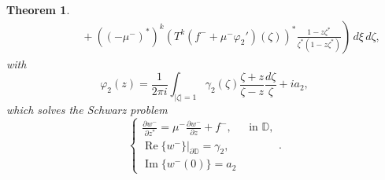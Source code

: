 \documentclass[12pt,reqno]{amsart}
\newtheorem{theorem}{Theorem}[section]
\theoremstyle{definition}
\theoremstyle{remark}
\newcommand{\p}{\partial}
\DeclareMathOperator{\im}{Im}
\DeclareMathOperator{\re}{Re}
\newcommand{\disk}{\mathbb{D}}
\begin{document}
\begin{theorem}
\begin{align*}
            &\quad\quad\quad\quad +  \left. ((-\mu^-)^*)^k (T^k(f^-+\mu^-\varphi_2')(\zeta))^*\frac{1-z \zeta^*}{\zeta^*(1-z\zeta^*)} \right)\,d\xi\,d\zeta,
        \end{align*}
        with 
        \[
            \varphi_2(z) = \frac{1}{2\pi i} \int_{|\zeta|=1} \gamma_2(\zeta) \frac{\zeta + z}{\zeta -z} \frac{d\zeta}{\zeta} + ia_2,
        \]
        which solves the Schwarz problem
        \[
            \begin{cases}
                \frac{\p w^-}{\p z^*} = \mu^- \frac{\p w^-}{\p z} + f^-, & \text{ in } \disk,\\
                \re\{w^-\}|_{\p \disk} = \gamma_2,\\
                \im\{w^-(0)\} = a_2
            \end{cases}.
        \]
\end{theorem}
\end{document}

